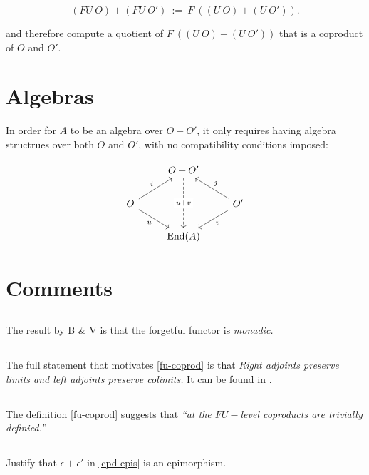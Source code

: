 \documentclass{amsart}
\begin{document}
\begin{equation}\label{fu-coprod}
	(FU \ O) + (FU \ O') \ := \ F \ \left( (U \ O) + (U \ O')
	\right).
\end{equation}

and therefore compute a quotient of $F \ \left( (U \ O) + (U \ O')
\right)$ that is a coproduct of $O$ and $O'$.

\section{Algebras}


In order for $A$ to be an algebra over $O + O'$, it only requires having
algebra structrues over both $O$ and $O'$, with no compatibility conditions
imposed:

\begin{equation}\label{opd-cpd}
		\begin{tikzcd}
			& O + O' \arrow[dd, dashed, "u + v" description] &
					\\
			O \arrow[rd, "u"'] \arrow[ru, "i"] & & O'
				\arrow[ld, "v"] \arrow[lu, "j"'] \\
			& \mathrm{End}(A) &
		\end{tikzcd}
\end{equation}

\section{Comments}

\subsection{} The result by B \& V is that the forgetful functor is
\emph{monadic.}

\subsection{} The full statement that motivates \eqref{fu-coprod} is that
\emph{Right adjoints preserve limits and left adjoints preserve colimits.}
It can be found in \cite{riehl-ctic}.

\subsection{} The definition \eqref{fu-coprod} suggests that
\emph{``at the $FU-$level coproducts are trivially definied.''}

\subsection{} Justify that $\epsilon + \epsilon'$ in \eqref{cpd-epis} is
an epimorphism.
\end{document}
